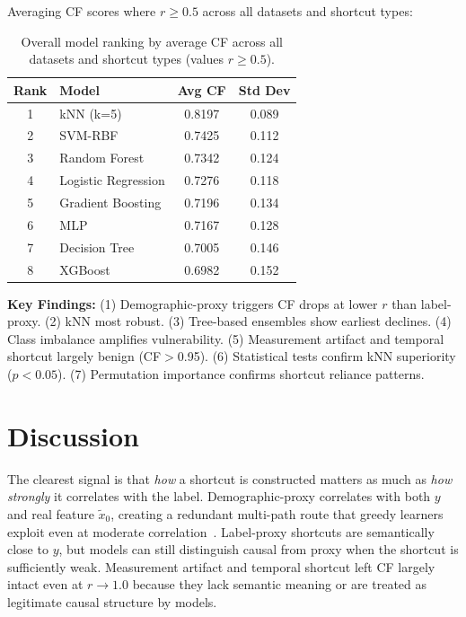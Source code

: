 \documentclass[conference]{IEEEtran}
\begin{document}
Averaging CF scores where $r\ge0.5$ across all datasets and shortcut types:

\begin{table}[H]
    \centering
    \footnotesize
    \setlength{\tabcolsep}{4pt}
    \caption{Overall model ranking by average CF across all datasets and shortcut types (values $r\ge0.5$).}
    \label{tab:model_ranking}
    \begin{tabular}{clcc}
        \toprule
        \textbf{Rank} & \textbf{Model} & \textbf{Avg CF} & \textbf{Std Dev} \\
        \midrule
        1 & kNN (k=5) & 0.8197 & 0.089 \\
        2 & SVM-RBF & 0.7425 & 0.112 \\
        3 & Random Forest & 0.7342 & 0.124 \\
        4 & Logistic Regression & 0.7276 & 0.118 \\
        5 & Gradient Boosting & 0.7196 & 0.134 \\
        6 & MLP & 0.7167 & 0.128 \\
        7 & Decision Tree & 0.7005 & 0.146 \\
        8 & XGBoost & 0.6982 & 0.152 \\
        \bottomrule
    \end{tabular}
\end{table}

\textbf{Key Findings:} (1) Demographic-proxy triggers CF drops at lower $r$ than label-proxy. (2) kNN most robust. (3) Tree-based ensembles show earliest declines. (4) Class imbalance amplifies vulnerability. (5) Measurement artifact and temporal shortcut largely benign (CF$>$0.95). (6) Statistical tests confirm kNN superiority ($p<0.05$). (7) Permutation importance confirms shortcut reliance patterns.


\section{Discussion}
\label{sec:discussion}

The clearest signal is that \textit{how} a shortcut is constructed matters as much as \textit{how strongly} it correlates with the label. Demographic-proxy correlates with both $y$ and real feature $\tilde{x}_0$, creating a redundant multi-path route that greedy learners exploit even at moderate correlation~\cite{geirhos2020shortcut, damour2020underspecification}. Label-proxy shortcuts are semantically close to $y$, but models can still distinguish causal from proxy when the shortcut is sufficiently weak. Measurement artifact and temporal shortcut left CF largely intact even at $r\to1.0$ because they lack semantic meaning or are treated as legitimate causal structure by models.
\end{document}
